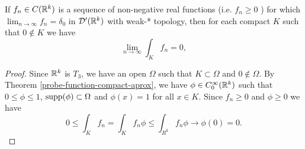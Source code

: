 \documentclass[main.tex]{subfiles}
\begin{document}
\begin{lemma}
\label{where-delta-vanish}
If $f_n\in C(\mathbb{R}^k)$ is a sequence of non-negative real functions (i.e. $f_n \geq 0$ ) for which 
$\lim_{n\to\infty} f_n = \delta_0$ in $\mathcal{D}'(\mathbb{R}^k)$ with weak-* topology, then for each compact $K$ such that $0\not\in K$ we have
\begin{equation}
\lim_{n\to\infty}\int_{K} f_n = 0,
\end{equation}
\end{lemma}
\begin{proof}
Since $\mathbb{R}^k$ is $T_3$, we have an open $\Omega$ such that $K\subset \Omega$ and $0\not\in\Omega$. 
By Theorem \ref{probe-function-compact-aprox}, we have $\phi\in C^\infty_0(\mathbb{R}^k)$ such that $0 \leq \phi \leq 1$, $\text{supp}(\phi)\subset \Omega$ and $\phi(x) = 1$ for all $x\in K$. Since $f_n \geq 0$ and $\phi \geq 0$ we have
\begin{equation}
0 \leq \int_K f_n = \int_K f_n\phi \leq \int_{R^k} f_n \phi \to \phi(0) = 0. 
\end{equation}
 

\end{proof}
\end{document}
